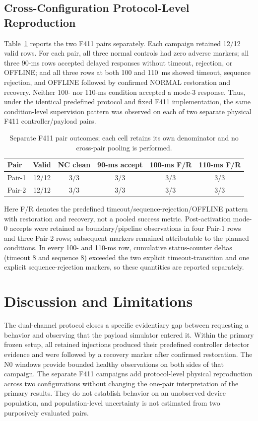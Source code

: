 \documentclass[conference]{IEEEtran}
\begin{document}
\subsection{Cross-Configuration Protocol-Level Reproduction}

Table~\ref{tab:f411} reports the two F411 pairs separately. Each campaign retained 12/12 valid rows. For each pair, all three normal controls had zero adverse markers; all three 90-ms rows accepted delayed responses without timeout, rejection, or OFFLINE; and all three rows at both 100 and 110~ms showed timeout, sequence rejection, and OFFLINE followed by confirmed NORMAL restoration and recovery. Neither 100- nor 110-ms condition accepted a mode-3 response. Thus, under the identical predefined protocol and fixed F411 implementation, the same condition-level supervision pattern was observed on each of two separate physical F411 controller/payload pairs.

\begin{table}[t]
\caption{Separate F411 pair outcomes; each cell retains its own denominator and no cross-pair pooling is performed.}
\label{tab:f411}
\centering
\scriptsize
\begin{tabular}{lccccc}
\toprule
Pair & Valid & NC clean & 90-ms accept & 100-ms F/R & 110-ms F/R \\
\midrule
Pair-1 & 12/12 & 3/3 & 3/3 & 3/3 & 3/3 \\
Pair-2 & 12/12 & 3/3 & 3/3 & 3/3 & 3/3 \\
\bottomrule
\end{tabular}
\end{table}

Here F/R denotes the predefined timeout/sequence-rejection/OFFLINE pattern with restoration and recovery, not a pooled success metric. Post-activation mode-0 accepts were retained as boundary/pipeline observations in four Pair-1 rows and three Pair-2 rows; subsequent markers remained attributable to the planned conditions. In every 100- and 110-ms row, cumulative status-counter deltas (timeout 8 and sequence 8) exceeded the two explicit timeout-transition and one explicit sequence-rejection markers, so these quantities are reported separately.

\section{Discussion and Limitations}

The dual-channel protocol closes a specific evidentiary gap between requesting a behavior and observing that the payload simulator entered it. Within the primary frozen setup, all retained injections produced their predefined controller detector evidence and were followed by a recovery marker after confirmed restoration. The N0 windows provide bounded healthy observations on both sides of that campaign. The separate F411 campaigns add protocol-level physical reproduction across two configurations without changing the one-pair interpretation of the primary results. They do not establish behavior on an unobserved device population, and population-level uncertainty is not estimated from two purposively evaluated pairs.
\end{document}
